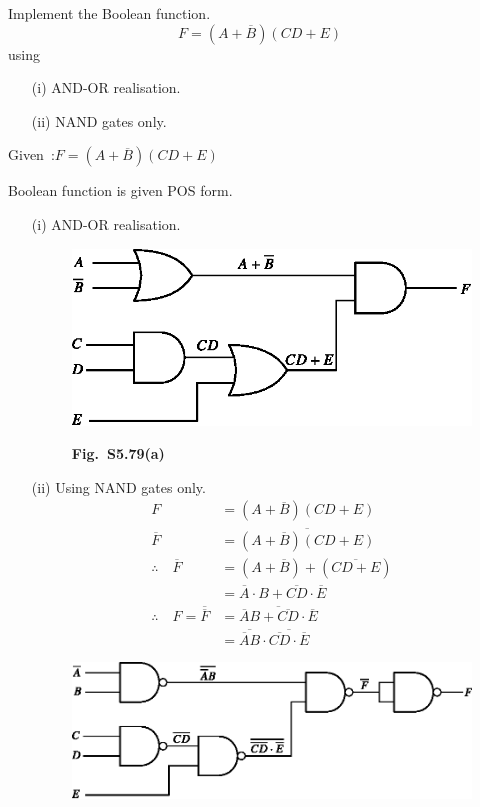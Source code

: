 \begin{problem}\label{prob5.79}
Implement the Boolean function.
$$
F=(A+\overline{B})(CD+E)
$$
using
\begin{itemize}
\item[(i)] AND-OR realisation.

\item[(ii)] NAND gates only.
\end{itemize}
\end{problem}

\begin{solution}
Given~:\quad $F=(A+\overline{B})(CD+E)$

Boolean function is given POS form.
\begin{itemize}
\item[(i)] AND-OR realisation.
\begin{figure}[H]
\centering
\includegraphics[scale=1.05]{chap5/figS7.eps}

\medskip
{\bf Fig.~S5.79(a)}
\end{figure}

\item[(ii)] Using NAND gates only.
\begin{align*}
F &= (A+\overline{B})(CD+E)\\[5pt]
\overline{F} &= \overline{(A+\overline{B})(CD+E)}\\[5pt]
\therefore\quad \overline{F} &= (A+\overline{B})+(\overline{CD+E})\\[5pt]
&= \overline{A}\cdot B+\overline{CD}\cdot \overline{E}\\[5pt]
\therefore\quad F=\overline{\overline{F}} &= \overline{\overline{A}B+\overline{CD}\cdot \overline{E}}\\[5pt]
&= \overline{\overline{A}B} \cdot \overline{\overline{CD}\cdot \overline{E}}
\end{align*}

\eject

\begin{figure}[H]
\centering
\includegraphics{chap5/figS8.eps}


\end{figure}
\end{itemize}
\end{solution}

